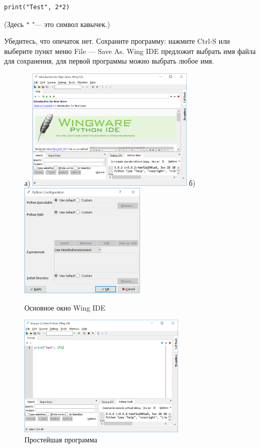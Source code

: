 \begin{verbatim}
print("Test", 2*2)
\end{verbatim}
(Здесь \verb`"` "--- это символ кавычек.)

Убедитесь, что опечаток нет. Сохраните программу: нажмите Ctrl-S или выберите пункт меню File --- Save As. 
Wing IDE предложит выбрать имя файла для сохранения, для первой программы можно выбрать любое имя.


\begin{figure}[p]
\centerline{
а) \includegraphics[width=8cm]{0_quick_start/wing_ide_0.png}\qquad 
б) \includegraphics[width=6cm]{0_quick_start/wing_ide_config.png}
}
\caption{Основное окно Wing IDE}
\label{wing-0}
\end{figure}

\begin{figure}
\centerline{
\includegraphics[width=8cm]{0_quick_start/wing_ide_1.png}
}
\caption{Простейшая программа}
\label{first-prg}
\end{figure}

